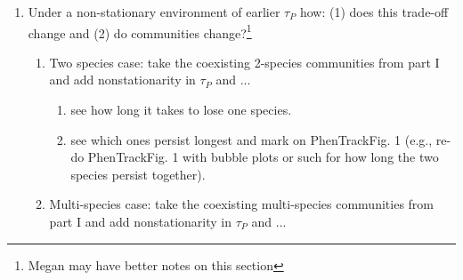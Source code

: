 \documentclass[11pt,a4paper,oneside]{article}
\begin{document}
\begin{enumerate}
\begin{enumerate}
\begin{enumerate}
\item Vary $\tau_P$ by drawing from a stationary distribution and let $R^*$ and $\alpha$ also vary by being drawn from each of their own (non-joint) distributions, run a bunch of models of 2 species communities and extract co-existing ones. 
\item Plot $\frac{\alpha_i}{\alpha_j}$ (or, perhaps better: realized proximity to $\tau_P$) by  $\frac{R^{*}_{i}}{R^{*}_{j}}$ for coexisting pairs of species (PhenTrackFig. 1, not currently shown here, see paper notes) -- we expect a cloud of space where coexistence is possible.
\end{enumerate}
\item Multi-species case
\begin{enumerate}
\item (Similar to above) Vary $\tau_P$ by drawing from a stationary distribution and let $R^*$ and $\alpha$ also vary by being drawn from each of their own (non-joint) distributions for a $n>2$ set of species, and pull out coexisting species from each run. 
\item Plot $\alpha$ (or realized proximity to $\tau_P$) against $R^*$ for each community of coexisting species (PhenTrackFig. 2, not currently shown here, see paper notes), measure the correlation and the noise around it.
\item Examine the distribution of correlations (and maybe noise) for all communities (PhenTrackFig. 3, not currently shown here, see paper notes).
\end{enumerate}
\end{enumerate}
\item Under a non-stationary environment of earlier $\tau_P$ how: (1) does this trade-off change and (2) do communities change?\footnote{Megan may have better notes on this section}
\begin{enumerate}
\item Two species case: take the coexisting 2-species communities from part I and add nonstationarity in $\tau_P$ and ...
\begin{enumerate}
\item see how long it takes to lose one species. 
\item see which ones persist longest and mark on PhenTrackFig. 1 (e.g., re-do PhenTrackFig. 1 with bubble plots or such for how long the two species persist together).
\end{enumerate}
\item Multi-species case: take the coexisting multi-species communities from part I and add nonstationarity in $\tau_P$ and ...

\end{enumerate}
\end{enumerate}
\end{document}
